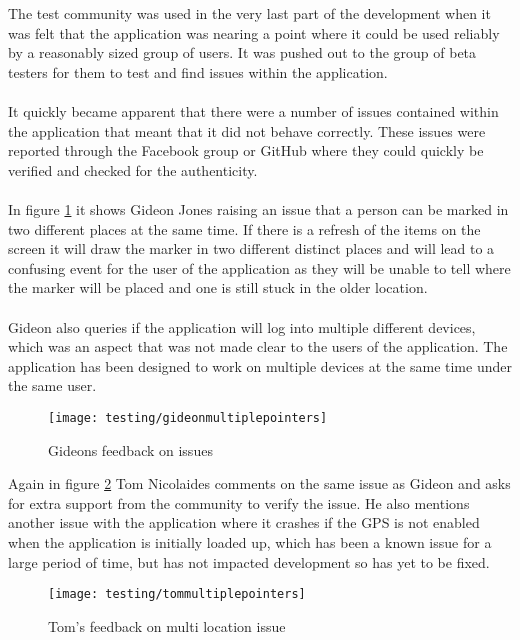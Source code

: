 \noindent
The test community was used in the very last part of the development when it was felt that the application was nearing a point where it could be used reliably by a reasonably sized group of users. It was pushed out to the group of beta testers for them to test and find issues within the application.\\
\\
It quickly became apparent that there were a number of issues contained within the application that meant that it did not behave correctly. These issues were reported through the Facebook group or GitHub where they could quickly be verified and checked for the authenticity.\\
\\
In figure \ref{fig:gideons_feedback} it shows Gideon Jones raising an issue that a person can be marked in two different places at the same time. If there is a refresh of the items on the screen it will draw the marker in two different distinct places and will lead to a confusing event for the user of the application as they will be unable to tell where the marker will be placed and one is still stuck in the older location.\\
\\
Gideon also queries if the application will log into multiple different devices, which was an aspect that was not made clear to the users of the application. The application has been designed to work on multiple devices at the same time under the same user.

\begin{figure}[H]
    \centering
    \texttt{[image: testing/gideonmultiplepointers]}
    \caption{Gideons feedback on issues}
    \label{fig:gideons_feedback}
\end{figure} 

\noindent
Again in figure \ref{fig:toms_feedback} Tom Nicolaides comments on the same issue as Gideon and asks for extra support from the community to verify the issue. He also mentions another issue with the application where it crashes if the GPS is not enabled when the application is initially loaded up, which has been a known issue for a large period of time, but has not impacted development so has yet to be fixed.

\begin{figure}[H]
    \centering
    \texttt{[image: testing/tommultiplepointers]}
    \caption{Tom's feedback on multi location issue}
    \label{fig:toms_feedback}
\end{figure}

